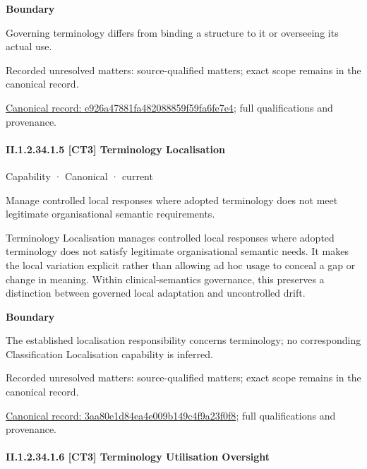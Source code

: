 \textbf{Boundary}



Governing terminology differs from binding a structure to it or overseeing its actual use.


{\small Recorded unresolved matters: source-qualified matters; exact scope remains in the canonical record.}\par
{\footnotesize \href{../../../../continuum/strategy/capability/e926a47881fa482088859f59fa6fe7e4.md}{Canonical record: e926a47881fa482088859f59fa6fe7e4}; full qualifications and provenance.}\par
\paragraph*{II.1.2.34.1.5 [CT3] Terminology Localisation}
\label{navigation:II.1.2.34.1.5}

\label{element:3aa80e1d84ea4e009b149c4f9a23f0f8}
{\small Capability · Canonical · current}\par

Manage controlled local responses where adopted terminology does not meet legitimate organisational semantic requirements.



Terminology Localisation manages controlled local responses where adopted terminology does not satisfy legitimate organisational semantic needs. It makes the local variation explicit rather than allowing ad hoc usage to conceal a gap or change in meaning. Within clinical-semantics governance, this preserves a distinction between governed local adaptation and uncontrolled drift.



\textbf{Boundary}



The established localisation responsibility concerns terminology; no corresponding Classification Localisation capability is inferred.


{\small Recorded unresolved matters: source-qualified matters; exact scope remains in the canonical record.}\par
{\footnotesize \href{../../../../continuum/strategy/capability/3aa80e1d84ea4e009b149c4f9a23f0f8.md}{Canonical record: 3aa80e1d84ea4e009b149c4f9a23f0f8}; full qualifications and provenance.}\par
\paragraph*{II.1.2.34.1.6 [CT3] Terminology Utilisation Oversight}
\label{navigation:II.1.2.34.1.6}

